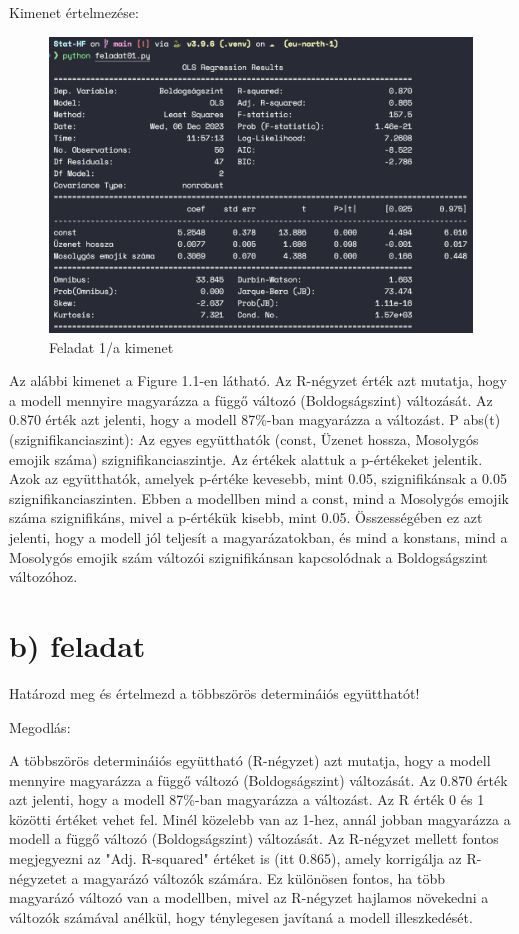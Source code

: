 \documentclass[11pt,a4paper,oneside]{report}
\begin{document}
Kimenet értelmezése:
\begin{figure}[!ht]
  \begin{center}
    \includegraphics[scale=0.4]{1.1.png}
    \caption{Feladat 1/a kimenet}
    \label{fig:TexnicCenter}
  \end{center}
\end{figure}
Az alábbi kimenet a Figure 1.1-en látható. Az R-négyzet érték azt mutatja, hogy a modell mennyire magyarázza a függő változó (Boldogságszint) változását. Az 0.870 érték azt jelenti, hogy a modell 87\%-ban magyarázza a változást.
P \> abs(t) (szignifikanciaszint): Az egyes együtthatók (const, Üzenet hossza, Mosolygós emojik száma) szignifikanciaszintje. Az értékek alattuk a p-értékeket jelentik. Azok az együtthatók, amelyek p-értéke kevesebb, mint 0.05, szignifikánsak a 0.05 szignifikanciaszinten. Ebben a modellben mind a const, mind a Mosolygós emojik száma szignifikáns, mivel a p-értékük kisebb, mint 0.05.
Összességében ez azt jelenti, hogy a modell jól teljesít a magyarázatokban, és mind a konstans, mind a Mosolygós emojik szám változói szignifikánsan kapcsolódnak a Boldogságszint változóhoz.
\section{b) feladat}
Határozd meg és értelmezd a többszörös determináiós együtthatót!

Megodlás:

A többszörös determináiós együttható (R-négyzet) azt mutatja, hogy a modell mennyire magyarázza a függő változó (Boldogságszint) változását. Az 0.870 érték azt jelenti, hogy a modell 87\%-ban magyarázza a változást.
Az R érték 0 és 1 közötti értéket vehet fel. Minél közelebb van az 1-hez, annál jobban magyarázza a modell a függő változó (Boldogságszint) változását.
Az R-négyzet mellett fontos megjegyezni az "Adj. R-squared" értéket is (itt 0.865), amely korrigálja az R-négyzetet a magyarázó változók számára. Ez különösen fontos, ha több magyarázó változó van a modellben, mivel az R-négyzet hajlamos növekedni a változók számával anélkül, hogy ténylegesen javítaná a modell illeszkedését.
\end{document}
